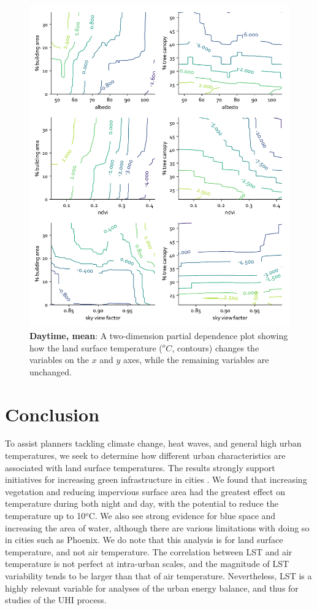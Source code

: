 \documentclass[review]{elsarticle}
\begin{document}
\begin{figure}
    \centering
    \includegraphics[width=\linewidth]{fig/report/pdp_2d_day_100.pdf}
    \caption{
    \textbf{Daytime, mean}: A two-dimension partial dependence plot showing how the land surface temperature ($^oC$, contours) changes the variables on the $x$ and $y$ axes, while the remaining variables are unchanged.
    }
    \label{fig:pdp_2dday_100}
\end{figure}


\section{Conclusion}
To assist planners tackling climate change, heat waves, and general high urban temperatures, we seek to determine how different urban characteristics are associated with land surface temperatures. 
The results strongly support initiatives for increasing green infrastructure in cities \cite{Larsen2015-da, Meerow2017-xv}. 
We found that increasing vegetation and reducing impervious surface area had the greatest effect on temperature during both night and day, with the potential to reduce the temperature up to 10$^o$C.
We also see strong evidence for blue space and increasing the area of water, although there are various limitations with doing so in cities such as Phoenix.
We do note that this analysis is for land surface temperature, and not air temperature. 
The correlation between LST and air temperature is not perfect at intra-urban scales, and the magnitude of LST variability tends to be larger  than that of air temperature.
Nevertheless, LST is a highly relevant variable for analyses of the urban energy balance, and thus for studies of the UHI process.
\end{document}
